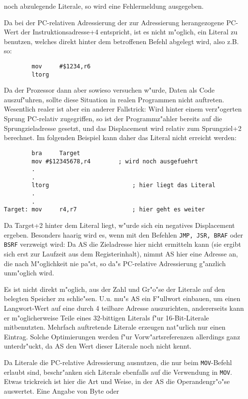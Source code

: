 \documentclass[12pt,a4paper,twoside]{report}
\newcommand{\tty}[1]{{\tt #1}}
\begin{document}
noch abzulegende Literale, so wird eine Fehlermeldung ausgegeben.
\par
Da bei der PC-relativen Adressierung der zur Adressierung herangezogene
PC-Wert der Instruktionsadresse+4 entspricht, ist es nicht m"oglich, ein
Literal zu benutzen, welches direkt hinter dem betroffenen Befehl abgelegt
wird, also z.B. so:
\begin{verbatim}
        mov     #$1234,r6
        ltorg
\end{verbatim}
Da der Prozessor dann aber sowieso versuchen w"urde, Daten als Code
auszuf"uhren, sollte diese Situation in realen Programmen nicht auftreten.
Wesentlich realer ist aber ein anderer Fallstrick:  Wird hinter einem
verz"ogerten Sprung PC-relativ zugegriffen, so ist der Programmz"ahler
bereits auf die Sprungzieladresse gesetzt, und das Displacement wird
relativ zum Sprungziel+2 berechnet.  Im folgenden Beispiel kann daher
das Literal nicht erreicht werden:
\begin{verbatim}
        bra     Target
        mov	#$12345678,r4        ; wird noch ausgefuehrt
        .
        .
        ltorg                        ; hier liegt das Literal
        .
        .
Target: mov     r4,r7                ; hier geht es weiter
\end{verbatim}
Da Target+2 hinter dem Literal liegt, w"urde sich ein negatives
Displacement ergeben.  Besonders haarig wird es, wenn mit den
Befehlen \tty{JMP, JSR, BRAF} oder \tty{BSRF} verzweigt wird:  Da AS die
Zieladresse hier nicht ermitteln kann (sie ergibt sich erst zur
Laufzeit aus dem Registerinhalt), nimmt AS hier eine Adresse an,
die nach M"oglichkeit nie pa"st, so da"s PC-relative Adressierung g"anzlich
unm"oglich wird.
\par
Es ist nicht direkt m"oglich, aus der Zahl und Gr"o"se der Literale
auf den belegten Speicher zu schlie"sen.  U.u. mu"s AS ein F"ullwort
einbauen, um einen Langwort-Wert auf eine durch 4 teilbare Adresse
auszurichten, andererseits kann er m"oglicherweise Teile eines
32-bittigen Literals f"ur 16-Bit-Literale mitbenutzten.  Mehrfach
auftretende Literale erzeugen nat"urlich nur einen Eintrag.  Solche
Optimierungen werden f"ur Vorw"artsreferenzen allerdings ganz
unterdr"uckt, da AS den Wert dieser Literale noch nicht kennt.
\par
Da Literale die PC-relative Adressierung ausnutzen, die nur beim
\tty{MOV}-Befehl erlaubt sind, beschr"anken sich Literale ebenfalls auf
die Verwendung in \tty{MOV}.  Etwas trickreich ist hier die Art und Weise,
in der AS die Operandengr"o"se auswertet.  Eine Angabe von Byte oder
\end{document}
